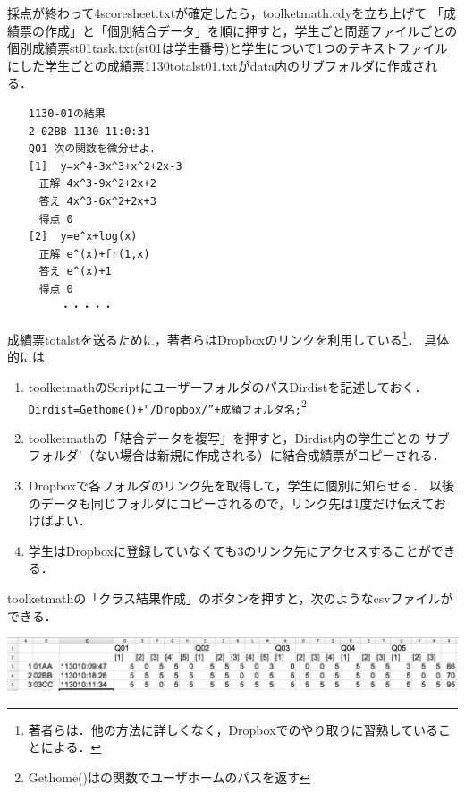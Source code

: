 \documentclass[a4j,12pt]{ujarticle}
\begin{document}
採点が終わって4scoresheet.txtが確定したら，toolketmath.cdyを立ち上げて
「成績票の作成」と「個別結合データ」を順に押すと，学生ごと問題ファイルごとの個別成績票st01task.txt(st01は学生番号)と学生について1つのテキストファイルにした学生ごとの成績票1130totalst01.txtがdata内のサブフォルダに作成される．\vspace{-0.5zw}

\begin{verbatim}
　　1130-01の結果
　　2 02BB 1130 11:0:31
　　Q01 次の関数を微分せよ．
　　[1]  y=x^4-3x^3+x^2+2x-3
　　　正解 4x^3-9x^2+2x+2
　　　答え 4x^3-6x^2+2x+3
　　　得点 0
　　[2]  y=e^x+log(x)
　　　正解 e^(x)+fr(1,x)
　　　答え e^(x)+1
　　　得点 0
　　　　　・・・・・
\end{verbatim}
\vspace{-0.5zw}

成績票totalstを送るために，著者らはDropboxのリンクを利用している\footnote{著者らは．他の方法に詳しくなく，Dropboxでのやり取りに習熟していることによる．}．%
具体的には\vspace{-1mm}

\begin{enumerate}
\item toolketmathのScriptにユーザーフォルダのパスDirdistを記述しておく．\\
\hspace*{2zw}\verb|Dirdist=Gethome()+"/Dropbox/”+成績フォルダ名;|\footnote{Gethome()は\ketcindy の関数でユーザホームのパスを返す}\vspace{-2mm}
\item toolketmathの「結合データを複写」を押すと，Dirdist内の学生ごとの
サブフォルダ’（ない場合は新規に作成される）に結合成績票がコピーされる．\vspace{-2mm}
\item Dropboxで各フォルダのリンク先を取得して，学生に個別に知らせる．
以後のデータも同じフォルダにコピーされるので，リンク先は1度だけ伝えておけばよい．\vspace{-2mm}
\item 学生はDropboxに登録していなくても3のリンク先にアクセスすることができる．
\end{enumerate}\vspace{-1mm}

toolketmathの「クラス結果作成」のボタンを押すと，次のようなcsvファイルができる．
\begin{center}
\includegraphics[bb=0.00 0.00 1184.00 141.00,width=140mm]{fig/csvbw.pdf}
\end{center}
\end{document}

